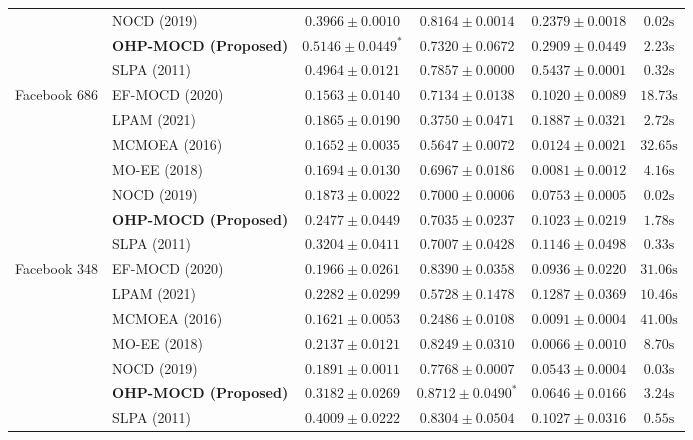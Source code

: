 \documentclass{llncs}
\begin{document}
\begin{table}[t]
{\begin{tabular}{@{}llcccc@{}}
 & NOCD (2019) & $0.3966 \pm 0.0010$ & $\mathbf{0.8164 \pm 0.0014}$ & $0.2379 \pm 0.0018$ & $0.02\text{s}$ \\
 & \textbf{OHP-MOCD (Proposed)} & $\mathbf{0.5146 \pm 0.0449^*}$ & $0.7320 \pm 0.0672$ & $0.2909 \pm 0.0449$ & $2.23\text{s}$ \\
 & SLPA (2011) & $0.4964 \pm 0.0121$ & $0.7857 \pm 0.0000$ & $\mathbf{0.5437 \pm 0.0001}$ & $0.32\text{s}$ \\
\midrule
Facebook 686 & EF-MOCD (2020) & $0.1563 \pm 0.0140$ & $\mathbf{0.7134 \pm 0.0138}$ & $0.1020 \pm 0.0089$ & $18.73\text{s}$ \\
 & LPAM (2021) & $0.1865 \pm 0.0190$ & $0.3750 \pm 0.0471$ & $\mathbf{0.1887 \pm 0.0321}$ & $2.72\text{s}$ \\
 & MCMOEA (2016) & $0.1652 \pm 0.0035$ & $0.5647 \pm 0.0072$ & $0.0124 \pm 0.0021$ & $32.65\text{s}$ \\
 & MO-EE (2018) & $0.1694 \pm 0.0130$ & $0.6967 \pm 0.0186$ & $0.0081 \pm 0.0012$ & $4.16\text{s}$ \\
 & NOCD (2019) & $0.1873 \pm 0.0022$ & $0.7000 \pm 0.0006$ & $0.0753 \pm 0.0005$ & $0.02\text{s}$ \\
 & \textbf{OHP-MOCD (Proposed)} & $0.2477 \pm 0.0449$ & $0.7035 \pm 0.0237$ & $0.1023 \pm 0.0219$ & $1.78\text{s}$ \\
 & SLPA (2011) & $\mathbf{0.3204 \pm 0.0411}$ & $0.7007 \pm 0.0428$ & $0.1146 \pm 0.0498$ & $0.33\text{s}$ \\
\midrule
Facebook 348 & EF-MOCD (2020) & $0.1966 \pm 0.0261$ & $0.8390 \pm 0.0358$ & $0.0936 \pm 0.0220$ & $31.06\text{s}$ \\
 & LPAM (2021) & $0.2282 \pm 0.0299$ & $0.5728 \pm 0.1478$ & $\mathbf{0.1287 \pm 0.0369}$ & $10.46\text{s}$ \\
 & MCMOEA (2016) & $0.1621 \pm 0.0053$ & $0.2486 \pm 0.0108$ & $0.0091 \pm 0.0004$ & $41.00\text{s}$ \\
 & MO-EE (2018) & $0.2137 \pm 0.0121$ & $0.8249 \pm 0.0310$ & $0.0066 \pm 0.0010$ & $8.70\text{s}$ \\
 & NOCD (2019) & $0.1891 \pm 0.0011$ & $0.7768 \pm 0.0007$ & $0.0543 \pm 0.0004$ & $0.03\text{s}$ \\
 & \textbf{OHP-MOCD (Proposed)} & $0.3182 \pm 0.0269$ & $\mathbf{0.8712 \pm 0.0490^*}$ & $0.0646 \pm 0.0166$ & $3.24\text{s}$ \\
 & SLPA (2011) & $\mathbf{0.4009 \pm 0.0222}$ & $0.8304 \pm 0.0504$ & $0.1027 \pm 0.0316$ & $0.55\text{s}$ \\

\end{tabular}}
\end{table}
\end{document}

